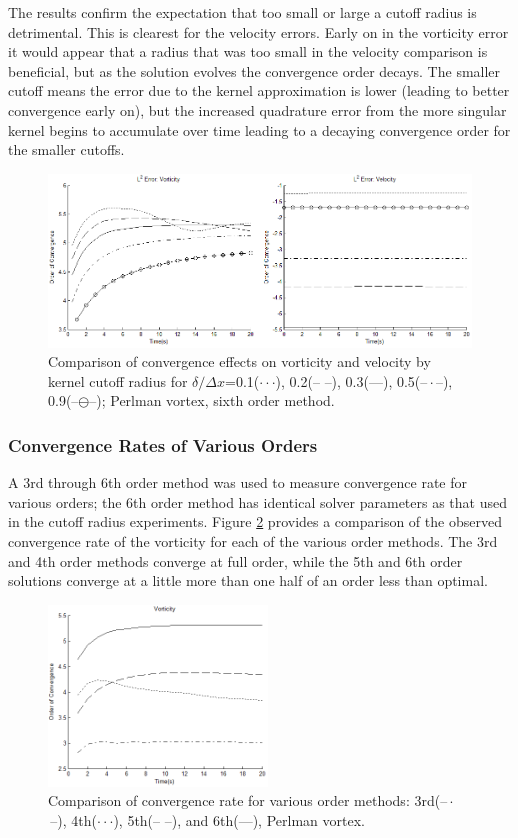 \documentclass[]{aiaa-tc}%
\begin{document}
The results confirm the expectation that too small or large a cutoff radius is detrimental. This is clearest for the velocity errors. Early on in the vorticity error it would appear that a radius that was too small in the velocity comparison is beneficial, but as the solution evolves the convergence order decays. The smaller cutoff means the error due to the kernel approximation is lower (leading to better convergence early on), but the increased quadrature error from the more singular kernel begins to accumulate over time leading to a decaying convergence order for the smaller cutoffs.
\begin{figure}
\centering
\includegraphics[width=1\textwidth]{CutoffWU.PNG}
\caption{\label{fig:CutoffWU}Comparison of convergence effects on vorticity and velocity by kernel cutoff radius for $\delta/\Delta x$=0.1($\cdot \cdot \cdot$), 0.2(--{ }--), 0.3(---), 0.5(--\,$\cdot$\,--), 0.9(--\!$\ominus$\!--);  Perlman vortex, sixth order method.}
\end{figure}

\subsubsection{Convergence Rates of Various Orders}
A 3rd through 6th order method was used to measure convergence rate for various orders; the 6th order method has identical solver parameters as that used in the cutoff radius experiments. Figure \ref{fig:Porder} provides a comparison of the observed convergence rate of the vorticity for each of the various order methods. The 3rd and 4th order methods converge at full order, while the 5th and 6th order solutions converge at a little more than one half of an order less than optimal.

\begin{figure}
\centering
\includegraphics[width=0.52\textwidth]{PorderR.PNG}
\caption{\label{fig:Porder}Comparison of convergence rate for various order methods: 3rd(--\,$\cdot$\,--), 4th($\cdot \cdot \cdot$), 5th(--{ }--), and 6th(---), Perlman vortex.}
\end{figure}
\end{document}
